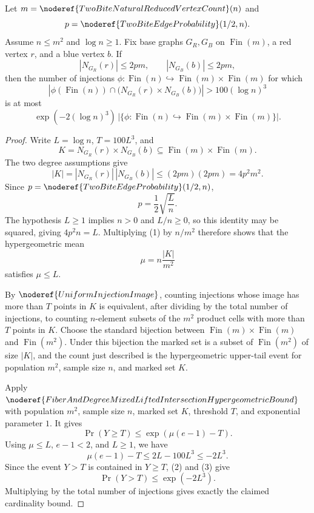 \begin{helper}[FiberAndDegreeMixedLiftedIntersectionFixedPairInjectionTail]
\label{helper:FiberAndDegreeMixedLiftedIntersectionFixedPairInjectionTail}
Let \(m=\noderef{TwoBiteNaturalReducedVertexCount}(n)\) and
\[
p=\noderef{TwoBiteEdgeProbability}(1/2,n).
\]
Assume \(n\le m^2\) and \(\log n\ge1\).  Fix base graphs \(G_R,G_B\) on
\(\operatorname{Fin}(m)\), a red vertex \(r\), and a blue vertex \(b\).  If
\[
|N_{G_R}(r)|\le2pm,\qquad |N_{G_B}(b)|\le2pm,
\]
then the number of injections
\(\phi:\operatorname{Fin}(n)\hookrightarrow \operatorname{Fin}(m)\times
\operatorname{Fin}(m)\) for which
\[
\left|
\phi(\operatorname{Fin}(n))\cap
\bigl(N_{G_R}(r)\times N_{G_B}(b)\bigr)
\right|
>100(\log n)^3
\]
is at most
\[
\exp(-2(\log n)^3)\,
\left|\{\phi:\operatorname{Fin}(n)\hookrightarrow
\operatorname{Fin}(m)\times\operatorname{Fin}(m)\}\right|.
\]
\end{helper}

\begin{proof}
Write \(L=\log n\), \(T=100L^3\), and
\[
K=N_{G_R}(r)\times N_{G_B}(b)
\subseteq \operatorname{Fin}(m)\times\operatorname{Fin}(m).
\]
The two degree assumptions give
\[
|K|=|N_{G_R}(r)|\,|N_{G_B}(b)|
\le (2pm)(2pm)=4p^2m^2.
\tag{1}
\]
Since \(p=\noderef{TwoBiteEdgeProbability}(1/2,n)\),
\[
p=\frac12\sqrt{\frac Ln}.
\]
The hypothesis \(L\ge1\) implies \(n>0\) and \(L/n\ge0\), so this identity
may be squared, giving \(4p^2n=L\).  Multiplying (1) by \(n/m^2\) therefore
shows that the hypergeometric mean
\[
\mu=n\frac{|K|}{m^2}
\]
satisfies \(\mu\le L\).

By \(\noderef{UniformInjectionImage}\), counting injections whose image has
more than \(T\) points in \(K\) is equivalent, after dividing by the total
number of injections, to counting \(n\)-element subsets of the \(m^2\) product
cells with more than \(T\) points in \(K\).  Choose the standard bijection
between \(\operatorname{Fin}(m)\times\operatorname{Fin}(m)\) and
\(\operatorname{Fin}(m^2)\).  Under this bijection the marked set is a subset
of \(\operatorname{Fin}(m^2)\) of size \(|K|\), and the count just described
is the hypergeometric upper-tail event for population \(m^2\), sample size
\(n\), and marked set \(K\).

Apply
\(\noderef{FiberAndDegreeMixedLiftedIntersectionHypergeometricBound}\) with
population \(m^2\), sample size \(n\), marked set \(K\), threshold \(T\), and
exponential parameter \(1\).  It gives
\[
\Pr(Y\ge T)\le \exp(\mu(e-1)-T).
\tag{2}
\]
Using \(\mu\le L\), \(e-1<2\), and \(L\ge1\), we have
\[
\mu(e-1)-T\le 2L-100L^3\le -2L^3.
\tag{3}
\]
Since the event \(Y>T\) is contained in \(Y\ge T\), (2) and (3) give
\[
\Pr(Y>T)\le \exp(-2L^3).
\]
Multiplying by the total number of injections gives exactly the claimed
cardinality bound.
\end{proof}

